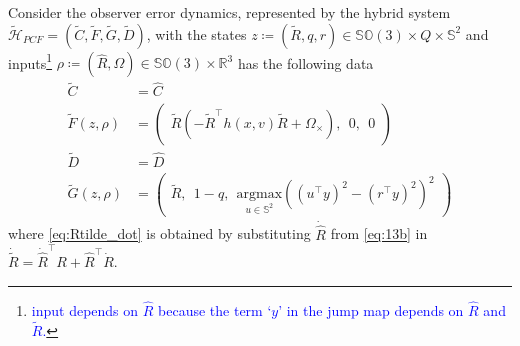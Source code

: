 \documentclass{article}
\newcommand{\SOthree}{\mathbb{SO}(3)}
\newcommand{\R}[1]{\mathbb{R}^{#1}}
\newtheorem{theorem}{Theorem}
\newcommand{\brackets}[1]{\left(#1\right)}
\newcommand{\textblue}[1]{\textcolor{blue}{#1}}
\newcommand{\Rtilde}{\tilde{R}}
\begin{document}
Consider the observer error dynamics, represented by the hybrid system $\tilde{\mathcal{H}}_{PCF} = (\tilde{C}, \tilde{F}, \tilde{G}, \tilde{D})$, with the states $z \coloneqq (\Rtilde, q, r) \in \SOthree\times Q \times \mathbb{S}^2$ and inputs\footnote{\textblue{input depends on $\hat{R}$ because the term `$y$' in the jump map depends on $\hat{R}$ and $\Rtilde$.}} $\rho \coloneqq (\hat{R}, \Omega)\in\SOthree\times \R{3}$ has the following data
\begin{subequations}\label{eq:hybrid_observer_error}
\begin{align}
\tilde{C}& = \hat{C}\\
\tilde{F}(z, \rho)& = \begin{pmatrix}
    \Rtilde\brackets{-\Rtilde^\top h(x, v) \Rtilde + \Omega_\times}, \:\: 0, \:\: 0\end{pmatrix} \label{eq:Rtilde_dot}\\
\tilde{D} &= \hat{D}\\
\tilde{G}(z, \rho) &= \begin{pmatrix}
\Rtilde, \:\: 1 - q, \:\: \underset{u\in\mathbb{S}^2}{\mathrm{argmax}}\left((u^\top y)^2 - (r^\top y)^2\right)^2
\end{pmatrix}
\end{align}
\end{subequations}
where \eqref{eq:Rtilde_dot} is obtained by substituting $\dot{\hat{R}}$ from \eqref{eq:13b} in $\dot{\Rtilde} = \dot{\hat{R}}^\top R + \hat{R}^\top \dot{R}$. 

\end{document}
